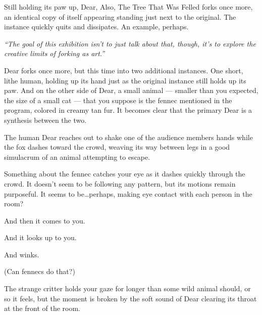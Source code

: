 Still holding its paw up, Dear, Also, The Tree That Was Felled forks once more, an identical copy of itself appearing standing just next to the original. The instance quickly quits and dissipates. An example, perhaps.

\emph{``The goal of this exhibition isn't to just talk about that, though, it's to explore the creative limits of forking as art.''}

Dear forks once more, but this time into two additional instances. One short, lithe human, holding up its hand just as the original instance still holds up its paw. And on the other side of Dear, a small animal --- smaller than you expected, the size of a small cat --- that you suppose is the fennec mentioned in the program, colored in creamy tan fur. It becomes clear that the primary Dear is a synthesis between the two.

The human Dear reaches out to shake one of the audience members hands while the fox dashes toward the crowd, weaving its way between legs in a good simulacrum of an animal attempting to escape.


Something about the fennec catches your eye as it dashes quickly through the crowd. It doesn't seem to be following any pattern, but its motions remain purposeful. It seems to be\ldots{}perhaps, making eye contact with each person in the room?

\newpage

\null
\vfill

And then it comes to you.

\null
\vfill

\newpage

\null
\vfill

And it looks up to you.

\null
\vfill

\newpage

\null
\vfill

And winks.

\null
\vfill

\newpage

\null
\vfill

\begin{flushright}
  (Can fennecs do that?)
\end{flushright}

\newpage

\null
\vfill

The strange critter holds your gaze for longer than some wild animal should, or so it feels, but the moment is broken by the soft sound of Dear clearing its throat at the front of the room.

